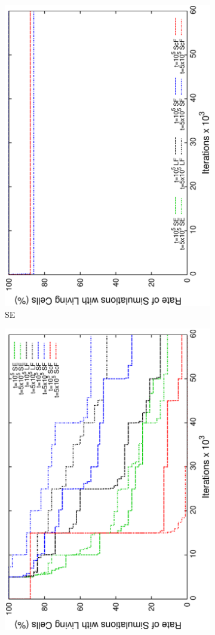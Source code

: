 \begin{figure}[h]
\begin{subfigure}{.25\textwidth}
 \centering
 \includegraphics[width=.7\linewidth, angle =-90]{img/endingStable.eps}
 \caption{SE}
 \label{fig:sfig1}
\end{subfigure}%
\begin{subfigure}{.25\textwidth}
 \centering
 \includegraphics[width=.7\linewidth, angle =-90]{img/endingVar.eps}

\end{subfigure}
\end{figure}
